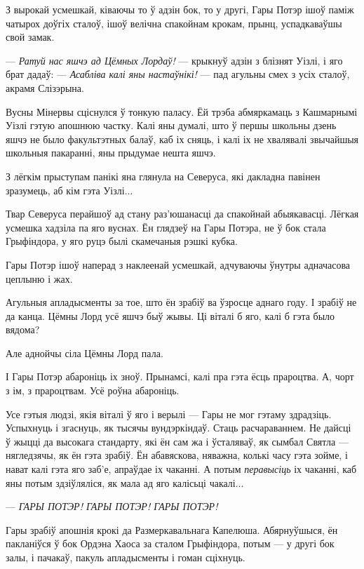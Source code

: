 З вырокай усмешкай, ківаючы то ў адзін бок, то у другі, Гары Потэр ішоў 
паміж чатырох доўгіх сталоў, ішоў велічна спакойнам крокам, прынц, успадкаваўшы
свой замак. 

--- \emph{Ратуй нас яшчэ ад Цёмных Лордаў!} --- крыкнуў адзін з блізнят Уізлі, 
і яго брат дадаў: --- \emph{Асабліва калі яны настаўнікі!} --- пад агульны смех
з усіх сталоў, акрамя Слізэрына.

Вусны Мінервы сціснулся ў тонкую паласу. Ёй трэба абмяркамаць з Кашмарнымі Уізлі
гэтую апошнюю частку. Калі яны думалі, што ў першы школьны дзень яшчэ не было 
факультэтных балаў, каб іх сняць, і калі іх не хвалявалі звычайшыя школьныя пакаранні,
яны прыдумае нешта яшчэ.

З лёгкім прыступам панікі яна глянула на Северуса, які дакладна павінен зразумець, аб кім гэта Уізлі...

Твар Северуса перайшоў ад стану раз'юшанасці да спакойнай абыякавасці. Лёгкая 
усмешка хадзіла па яго вуснах. Ён глядзеў на Гары Потэра, не ў бок стала Грыфіндора,
у яго руцэ былі скамечаныя рэшкі кубка.

\later

Гары Потэр ішоў наперад з наклеенай усмешкай, адчуваючы ўнутры адначасова 
цеплыню і жах.

Агульныя апладысменты за тое, што ён зрабіў ва ўзросце аднаго году. І зрабіў не да канца.
Цёмны Лорд усё яшчэ быў жывы. Ці віталі б яго, калі б гэта было вядома?

Але аднойчы сіла Цёмны Лорд пала.

І Гары Потэр абароніць іх зноў. Прынамсі, калі пра гэта ёсць прароцтва. А, чорт з 
ім, з прароцтвам. Усё роўна абароніць.

Усе гэтыя людзі, якія віталі ў яго і верылі --- Гары не мог гэтаму здрадзіць.
Успыхнуць і згаснуць, як тысячы вундэркіндаў. Стаць расчараваннем. Не дайсці 
ў жыцці да высокага стандарту, які ён сам жа і ўсталяваў, як сымбал Святла ---
нягледзячы, як ён гэта зрабіў. Ён абавяскова, няважна, колькі часу гэта зойме, 
і нават калі гэта яго заб'е, апраўдае іх чаканні. А потым \emph{перавысіць}
іх чаканні, каб яны потым здзіўляліся, як мала ад яго калісьці чакалі...

--- \emph{ГАРЫ ПОТЭР! ГАРЫ ПОТЭР! ГАРЫ ПОТЭР!}

Гары зрабіў апошнія крокі да Размеркавальнага Капелюша. Абярнуўшыся, ён пакланіўся ў бок
Ордэна Хаоса за сталом Грыфіндора, потым --- у другі бок залы, і 
пачакаў, пакуль апладысменты і гоман сціхнуць.

